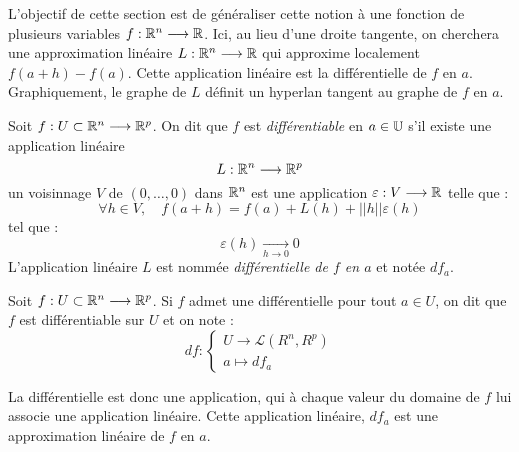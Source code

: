 L'objectif de cette section est de généraliser cette notion à une fonction de plusieurs variables $f : \mathbb{R}^n \longrightarrow \mathbb{R}$. 
Ici, au lieu d'une droite tangente, on cherchera une approximation linéaire $L : \mathbb{R}^n \longrightarrow \mathbb{R}$ qui approxime 
localement $f(a + h) - f(a)$. 
Cette application linéaire est la différentielle de $f$ en $a$. Graphiquement, le graphe de $L$ définit un 
hyperlan tangent au graphe de $f$ en $a$. 

\begin{definition}[Différentielle]
    Soit $f : U \subset \mathbb{R}^n \longrightarrow \mathbb{R}^p$. On dit que $f$ est \emph{différentiable} en $a \in \mathbb{U}$ 
    s'il existe une application linéaire 
        \[ L : \mathbb{R}^n \longrightarrow \mathbb{R}^p \] 
    un voisinnage $V$ de $(0, \dots, 0)$ dans $\mathbb{R}^n$ est une application $\varepsilon : V \longrightarrow \mathbb{R}$ telle que : 
        \[ \boxed{\forall h \in V, \quad f(a+h) = f(a) + L(h) + ||h|| \varepsilon(h)} \] 
    tel que : 
        \[ \boxed{\varepsilon(h) \underset{h \to 0}{\longrightarrow} 0} \] 
    L'application linéaire $L$ est nommée \emph{différentielle de $f$ en $a$} et notée $df_a$. 
\end{definition}

\begin{definition}
    Soit $f : U \subset \mathbb{R}^n \longrightarrow \mathbb{R}^p$. Si $f$ admet une différentielle 
    pour tout $a \in U$, on dit que $f$ est différentiable sur $U$ et on note : 
        \[ df : 
            \begin{cases}
                U \longrightarrow \mathcal{L}(R^n, R^p) \\ 
                a \longmapsto df_a 
            \end{cases} \] 
\end{definition}

La différentielle est donc une application, qui à chaque valeur du domaine de $f$ lui associe 
une application linéaire. Cette application linéaire, $df_a$ est une approximation linéaire de $f$ en $a$. 

